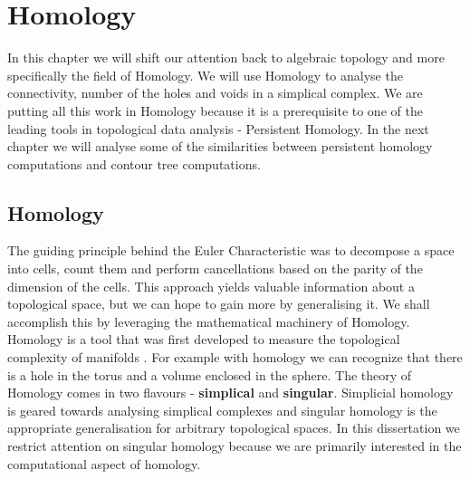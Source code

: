 \chapter{Homology}
\label{chapter5}

In this chapter we will shift our attention back to algebraic topology and more specifically the field of Homology. We will use Homology to analyse the connectivity, number of the holes and voids in a simplical complex. We are putting all this work in Homology because it is a prerequisite to one of the leading tools in topological data analysis - Persistent Homology. In the next chapter we will analyse some of the similarities between persistent homology computations and contour tree computations.

\section{Homology}



The guiding principle behind the Euler Characteristic was to decompose a space into cells, count them and perform cancellations based on the parity of the dimension of the cells. This approach yields valuable information about a topological space, but we can hope to gain more by generalising it. We shall accomplish this by leveraging the mathematical machinery of Homology. Homology is a tool that was first developed to measure the topological complexity of manifolds \cite{persistence-original}. For example with homology we can recognize that there is a hole in the torus and a volume enclosed in the sphere. The theory of Homology comes in two flavours - \textbf{simplical} and \textbf{singular}. Simplicial homology is geared towards analysing simplical complexes and singular homology is the appropriate generalisation for arbitrary topological spaces. In this dissertation we restrict attention on singular homology because we are primarily interested in the computational aspect of homology.

